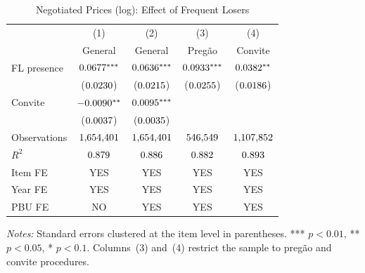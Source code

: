 \begin{table}[htbp]
\centering
\caption{Negotiated Prices (log): Effect of Frequent Losers}
\label{tab:prices}
\begin{threeparttable}
\small
\begin{tabular}{lcccc}
\toprule
 & (1) & (2) & (3) & (4) \\
 & General & General & Preg\~{a}o & Convite \\
\midrule
FL presence & $0.0677^{***}$ & $0.0636^{***}$ & $0.0933^{***}$ & $0.0382^{**}$ \\
            & ($0.0230$) & ($0.0215$) & ($0.0255$) & ($0.0186$) \\
Convite     & $-0.0090^{**}$ & $0.0095^{***}$ &           &           \\
            & ($0.0037$) & ($0.0035$) &           &           \\
\midrule
Observations & $1{,}654{,}401$ & $1{,}654{,}401$ & $546{,}549$ & $1{,}107{,}852$ \\
$R^{2}$      & $0.879$ & $0.886$ & $0.882$ & $0.893$ \\
Item FE      & YES & YES & YES & YES \\
Year FE      & YES & YES & YES & YES \\
PBU FE       & NO  & YES & YES & YES \\
\bottomrule
\end{tabular}
\begin{tablenotes}
\footnotesize
\item \textit{Notes:} Standard errors clustered at the item level in parentheses. *** $p<0.01$, ** $p<0.05$, * $p<0.1$. Columns~(3) and~(4) restrict the sample to preg\~ao and convite procedures.
\end{tablenotes}
\end{threeparttable}
\end{table}
